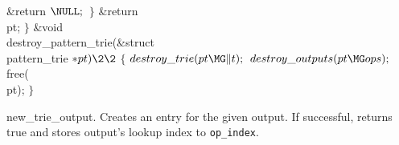 \&{return} ${}\NULL;{}$\6
\4${}\}{}$\2\6
\&{return} \\{pt};\6
\4${}\}{}$\2\7
\1\1\&{void} \\{destroy\_pattern\_trie}(\&{struct} \\{pattern\_trie} ${}{*}%
\\{pt})\2\2{}$\6
${}\{{}$\1\6
${}\\{destroy\_trie}(\\{pt}\MG\|t);{}$\6
${}\\{destroy\_outputs}(\\{pt}\MG\\{ops});{}$\6
\\{free}(\\{pt});\6
\4${}\}{}$\2\par
\fi

new\_trie\_output.
Creates an entry for the given output. If successful, returns true and stores
output's lookup index to {\tt op\_index}.

